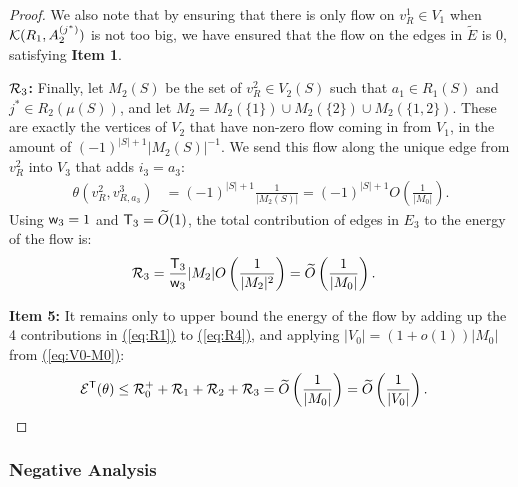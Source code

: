 \documentclass{article}
\newcommand{\eq}[1]{\hyperref[eq:#1]{(\ref*{eq:#1})}}
\renewcommand{\>}{\rangle}
\newcommand{\<}{\langle}
\renewcommand{\(}{\left(}
\renewcommand{\)}{\right)}
\def\w{{\sf w}}
\begin{document}
\begin{proof}
We also note that by ensuring that there is only flow on $v^1_{R}\in V_1$ when ${\cal K}({R}_1,A_2^{(j^*)})$ is not too big, we have ensured that the flow on the edges in $\tilde{E}$ is 0, satisfying \textbf{Item 1}. 

\vskip7pt
\noindent\textbf{${\cal R}_3$:} Finally, let $M_2(S)$ be the set of $v^2_{R}\in V_2(S)$ such that $a_1\in R_1(S)$ and $j^*\in R_2(\mu(S))$, and let $M_2=M_2(\{1\})\cup M_2(\{2\})\cup M_2(\{1,2\})$. These are exactly the vertices of $V_2$ that have non-zero flow coming in from $V_1$, in the amount of
$(-1)^{|S|+1}{|M_2(S)|}^{-1}.$
We send this flow along the unique edge from $v^2_{R}$ into $V_3$ that adds $i_3=a_3$:
\begin{align*}
\theta(v^2_{R},v^3_{R,a_3}) &=(-1)^{|S|+1}\frac{1}{|M_2(S)|}=(-1)^{|S|+1}O\left(\frac{1}{|M_0|}\right).
\end{align*}
Using $\w_3=1$ and ${\sf T}_3=\widetilde{O}(1)$, the total contribution of edges in $E_3$ to the energy of the flow is:
\begin{equation}
\begin{split}
{\cal R}_3 &= \frac{{\sf T}_3}{\w_3}|M_2|O\left(\frac{1}{|M_2|^2}\right)
=\widetilde{O}\left(\frac{1}{|M_0|}\right).
\end{split}\label{eq:R4}
\end{equation}

\vskip5pt
\noindent\textbf{Item 5:} It remains only to upper bound the energy of the flow by adding up the 4 contributions in \eq{R1} to \eq{R4}, and applying $|V_0|=(1+o(1))|M_0|$ from \eq{V0-M0}:
\begin{align*}
{\cal E}^{\sf T}(\theta) &\leq {\cal R}_0^++{\cal R}_1+{\cal R}_2+{\cal R}_3
=\widetilde{O}\left(\frac{1}{|M_0|} \right)=\widetilde{O}\left(\frac{1}{|V_0|} \right). \qedhere
\end{align*}
\end{proof}

\subsubsection{Negative Analysis}
\end{document}
